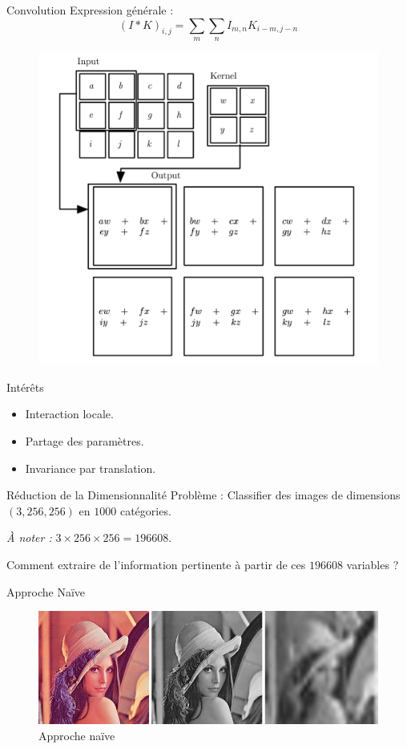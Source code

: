 \documentclass[11pt]{beamer}
\begin{document}
\begin{frame}{Convolution}
	Expression générale :
	$$(I*K)_{i,j} = \sum_{m}\sum_{n}{I_{m,n}K_{i-m,j-n}}$$
	\begin{figure}[H]
		\centering
		\includegraphics[scale=0.175]{Images/Convolution.png}
	\end{figure}
\end{frame}
\begin{frame}{Intérêts}
	\begin{itemize}
		\item Interaction locale.
		\item Partage des paramètres.
		\item Invariance par translation.
	\end{itemize}
\end{frame}

\begin{frame}{Réduction de la Dimensionnalité}
	Problème : Classifier des images de dimensions $(3, 256, 256)$ en $1000$ catégories.
	
	\emph{À noter :} $3 \times 256 \times 256 = 196608$.
	
	\begin{center}
		Comment extraire de l'information pertinente à partir de ces $196608$ variables ?
	\end{center}
\end{frame}
\begin{frame}{Approche Naïve}
	\begin{figure}[H]
		\centering
		\includegraphics[scale=0.4]{Images/Lena.jpg}
		\caption{Approche naïve}
	\end{figure}
\end{frame}
\end{document}
